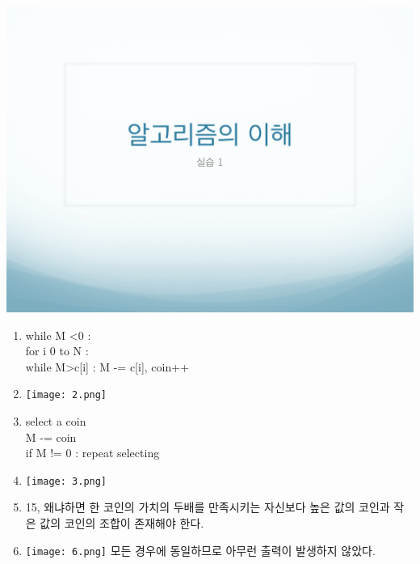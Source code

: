 \documentclass[11pt,a4paper]{article}
\begin{document}
\includegraphics[page=4, width=\textwidth]{1.pdf}
\begin{enumerate}
	\item 
	while M \textless 0 :\\
		for i 0 to N :\\
			while M\textgreater c[i] : M -= c[i], coin++\\
\item
	
\texttt{[image: 2.png]}	
\item
	select a coin\\
	M -= coin\\
	if M != 0 : repeat selecting

\item 
	
\texttt{[image: 3.png]}	

\item
	15, 왜냐하면 한 코인의 가치의 두배를 만족시키는 자신보다 높은 값의 코인과 작은 값의 코인의 조합이 존재해야 한다.
\item
	
\texttt{[image: 6.png]}	
모든 경우에 동일하므로 아무런 출력이 발생하지 않았다.

\end{enumerate}
\end{document}
